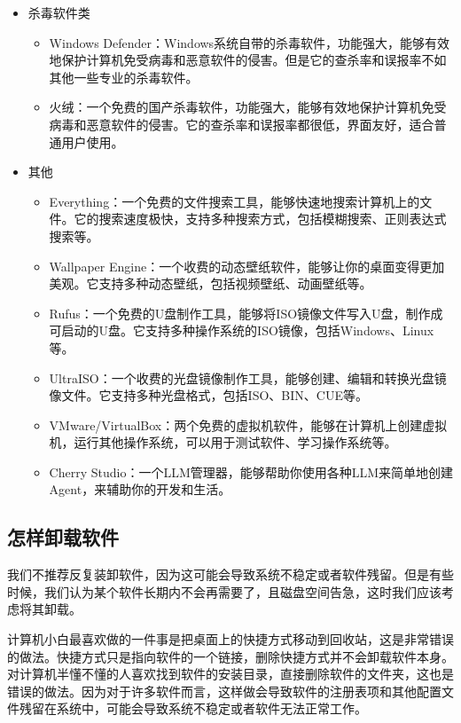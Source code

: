 \documentclass[../main.tex]{subfiles}
\begin{document}
\begin{itemize}
\begin{itemize}
    \end{itemize}
    \item 杀毒软件类
    \begin{itemize}
        \item Windows Defender：Windows系统自带的杀毒软件，功能强大，能够有效地保护计算机免受病毒和恶意软件的侵害。但是它的查杀率和误报率不如其他一些专业的杀毒软件。
        \item 火绒：一个免费的国产杀毒软件，功能强大，能够有效地保护计算机免受病毒和恶意软件的侵害。它的查杀率和误报率都很低，界面友好，适合普通用户使用。
    \end{itemize}
    \item 其他
    \begin{itemize}
        \item Everything：一个免费的文件搜索工具，能够快速地搜索计算机上的文件。它的搜索速度极快，支持多种搜索方式，包括模糊搜索、正则表达式搜索等。
        \item Wallpaper Engine：一个收费的动态壁纸软件，能够让你的桌面变得更加美观。它支持多种动态壁纸，包括视频壁纸、动画壁纸等。
        \item Rufus：一个免费的U盘制作工具，能够将ISO镜像文件写入U盘，制作成可启动的U盘。它支持多种操作系统的ISO镜像，包括Windows、Linux等。
        \item UltraISO：一个收费的光盘镜像制作工具，能够创建、编辑和转换光盘镜像文件。它支持多种光盘格式，包括ISO、BIN、CUE等。
        \item VMware/VirtualBox：两个免费的虚拟机软件，能够在计算机上创建虚拟机，运行其他操作系统，可以用于测试软件、学习操作系统等。
        \item Cherry Studio：一个LLM管理器，能够帮助你使用各种LLM来简单地创建Agent，来辅助你的开发和生活。
    \end{itemize}
\end{itemize}

\subsection{怎样卸载软件}

我们不推荐反复装卸软件，因为这可能会导致系统不稳定或者软件残留。但是有些时候，我们认为某个软件长期内不会再需要了，且磁盘空间告急，这时我们应该考虑将其卸载。

计算机小白最喜欢做的一件事是把桌面上的快捷方式移动到回收站，这是非常错误的做法。快捷方式只是指向软件的一个链接，删除快捷方式并不会卸载软件本身。对计算机半懂不懂的人喜欢找到软件的安装目录，直接删除软件的文件夹，这也是错误的做法。因为对于许多软件而言，这样做会导致软件的注册表项和其他配置文件残留在系统中，可能会导致系统不稳定或者软件无法正常工作。
\end{document}
